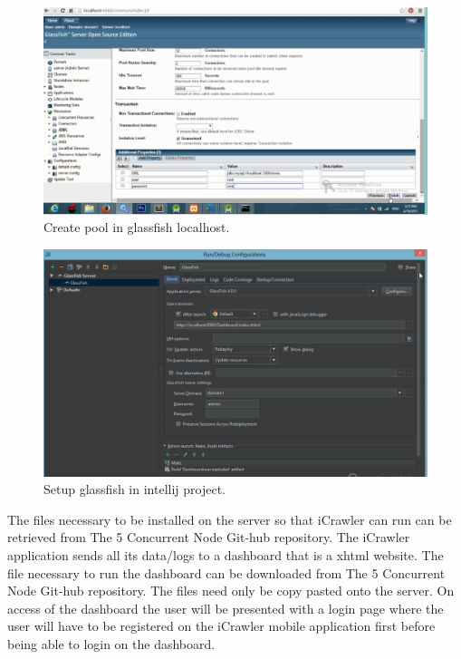 \documentclass[hidelinks, 12pt, oneside]{article}
\begin{document}
\begin{figure}[!htb]
\begin{center}
\caption{Create pool in glassfish localhost.}
\includegraphics[width=150mm,scale=0.6]{img/creatingPool2.png}
\end{center}
\label{Img:CreatingPool}
\end{figure}

\begin{figure}[!htb]
\begin{center}
\caption{Setup glassfish in intellij project.}
\includegraphics[width=150mm,scale=0.6]{img/intellijSetup.png}
\end{center}
\label{Img:CreatingPool}
\end{figure}
\clearpage
\newpage

	The files necessary to be installed on the server so that iCrawler can run can be retrieved from The 5 Concurrent Node Git-hub repository. The iCrawler 	application sends all its data/logs to a dashboard that is a xhtml website. The file necessary to run the dashboard can be downloaded from The 5 Concurrent Node Git-hub repository. The files need only be copy pasted onto the server. On access of the dashboard the user will be presented with a 			login page where the user will have to be registered on the iCrawler mobile application first before being able to login on the dashboard.\newpage
\end{document}
